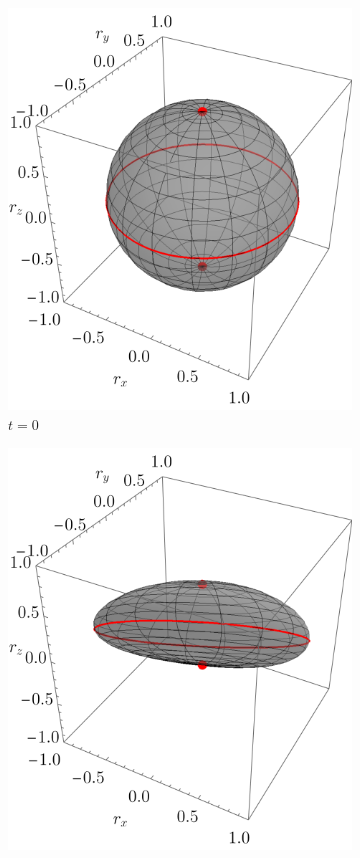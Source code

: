   \begin{figure}[ht!]
  \centering
  \begin{subfigure}{0.32\textwidth}
    \centering
    \includegraphics[width=0.9\linewidth]{chapter3/figures_toy/CNOT_p=0.5_t=0._r=0.9.png}
    \caption{$t=0$}
  \end{subfigure}%
  \begin{subfigure}{0.32\textwidth}
    \centering
    \includegraphics[width=0.9\linewidth]{chapter3/figures_toy/CNOT_p=0.1_t=0.5_r=0.9.png}

\end{subfigure}
\end{figure}
